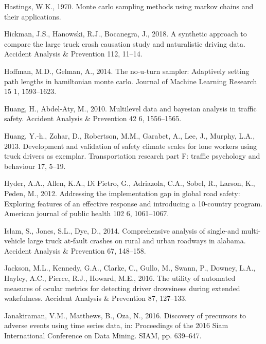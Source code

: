 \documentclass[12pt]{book}
\numberwithin{equation}{chapter}
\begin{document}
\leavevmode\hypertarget{ref-hastings1970monte}{}%
Hastings, W.K., 1970. Monte carlo sampling methods using markov chains and their applications.

\leavevmode\hypertarget{ref-hickman2018synthetic}{}%
Hickman, J.S., Hanowski, R.J., Bocanegra, J., 2018. A synthetic approach to compare the large truck crash causation study and naturalistic driving data. Accident Analysis \& Prevention 112, 11--14.

\leavevmode\hypertarget{ref-hoffman2014no}{}%
Hoffman, M.D., Gelman, A., 2014. The no-u-turn sampler: Adaptively setting path lengths in hamiltonian monte carlo. Journal of Machine Learning Research 15 1, 1593--1623.

\leavevmode\hypertarget{ref-huang2010multilevel}{}%
Huang, H., Abdel-Aty, M., 2010. Multilevel data and bayesian analysis in traffic safety. Accident Analysis \& Prevention 42 6, 1556--1565.

\leavevmode\hypertarget{ref-huang2013development}{}%
Huang, Y.-h., Zohar, D., Robertson, M.M., Garabet, A., Lee, J., Murphy, L.A., 2013. Development and validation of safety climate scales for lone workers using truck drivers as exemplar. Transportation research part F: traffic psychology and behaviour 17, 5--19.

\leavevmode\hypertarget{ref-hyder2012addressing}{}%
Hyder, A.A., Allen, K.A., Di Pietro, G., Adriazola, C.A., Sobel, R., Larson, K., Peden, M., 2012. Addressing the implementation gap in global road safety: Exploring features of an effective response and introducing a 10-country program. American journal of public health 102 6, 1061--1067.

\leavevmode\hypertarget{ref-islam2014comprehensive}{}%
Islam, S., Jones, S.L., Dye, D., 2014. Comprehensive analysis of single-and multi-vehicle large truck at-fault crashes on rural and urban roadways in alabama. Accident Analysis \& Prevention 67, 148--158.

\leavevmode\hypertarget{ref-jackson2016utility}{}%
Jackson, M.L., Kennedy, G.A., Clarke, C., Gullo, M., Swann, P., Downey, L.A., Hayley, A.C., Pierce, R.J., Howard, M.E., 2016. The utility of automated measures of ocular metrics for detecting driver drowsiness during extended wakefulness. Accident Analysis \& Prevention 87, 127--133.

\leavevmode\hypertarget{ref-janakiraman2016discovery}{}%
Janakiraman, V.M., Matthews, B., Oza, N., 2016. Discovery of precursors to adverse events using time series data, in: Proceedings of the 2016 Siam International Conference on Data Mining. SIAM, pp. 639--647.
\end{document}
